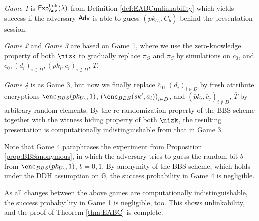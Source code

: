 \begin{description}
\item
\emph{Game 1} is $\operatorname{\mathsf{Exp}_{\mathsf{Adv}}^{link}}(\lambda)$   from Definition \ref{def:EABCunlinkability} which yields success if the adversary $\mathsf{Adv}$ is able to guess $(pk_{U_b}, C_b)$ behind the presentation session.

\item
\emph{Game 2} and \emph{Game 3} are based on Game 1, where we use  the zero-knowledge property of both $\nizk$ to gradually replace $\pi_O$ and $\pi_S$ by simulations on $\overline c_0$, and $\overline c_0, (d_i)_{i\in D}, (\overline pk_i, \overline c_i)_{i\notin D}$, $\overline T$.

\item
\emph{Game 4} is as Game 3, but now we finally replace $\overline c_0$, $(d_i)_{i\in D}$ by fresh attribute encryptions $\enc_{BBS}(pk_{U_b},1)$, $\left(\enc_{BBS}(sk',a_i)\right)_{i\in D}$, and $(\overline pk_i, \overline c_j)_{i\notin D}$, $\overline T$ by arbitrary random elements.
By the re-randomization property of the BBS scheme together with the witness hiding property of both $\nizk$, the resulting presentation is computationally indistinguishable from that in Game 3. 
\end{description}

Note that Game 4 paraphrases the experiment from Proposition \ref{prop:BBSanonymous}, in which the adversary tries to guess the random bit $b$ from $\enc_{BBS}(pk_{U_b},1)$, $b=0,1$.
By anonymity of the BBS scheme, which holds under the DDH assumption on $\mathbb G$, the success  probability in Game 4 is negligible.

As all changes between the above games are computationally indistinguishable, the success probabyility in Game 1 is negligible, too.
This shows unlinkability, and the proof of Theorem \ref{thm:EABC} is complete.

